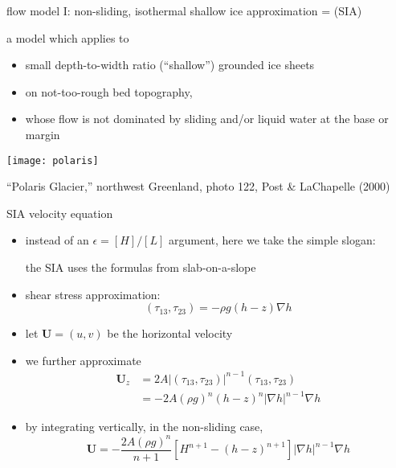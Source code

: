 \begin{frame}{flow model I: non-sliding, isothermal shallow ice approximation = (SIA)}

a model which applies to
\begin{itemize}
\item small depth-to-width ratio (``shallow'') grounded ice sheets
\item on not-too-rough bed topography,
\item whose flow is not dominated by sliding and/or liquid water at the base or margin
\end{itemize}

\begin{center}
  \texttt{[image: polaris]}

\tiny ``Polaris Glacier,'' northwest Greenland, photo 122, Post \& LaChapelle (2000)\nocite{PostLaChapelle}
\end{center}

\end{frame}


\begin{frame}{SIA velocity equation}

\begin{itemize}
\item instead of an $\epsilon = [H]/[L]$ argument, here we take the simple slogan:

\begin{center}
\alert{the SIA uses the formulas from slab-on-a-slope}
\end{center}
\item shear stress approximation:
	$$(\tau_{13},\tau_{23}) = - \rho g (h-z) \nabla h$$
\item let $\mathbf{U} = (u,v)$ be the horizontal velocity
\item we further approximate
\begin{align*}
\mathbf{U}_z &= 2 A |(\tau_{13},\tau_{23})|^{n-1} (\tau_{13},\tau_{23}) \\
     &= - 2 A (\rho g)^n (h-z)^n |\nabla h|^{n-1} \nabla h
\end{align*}
\item by integrating vertically, in the non-sliding case,
    $$\mathbf{U} = - \frac{2 A (\rho g)^n}{n+1} \left[H^{n+1} - (h-z)^{n+1}\right] |\nabla h|^{n-1} \nabla h$$
\end{itemize}
\end{frame}


